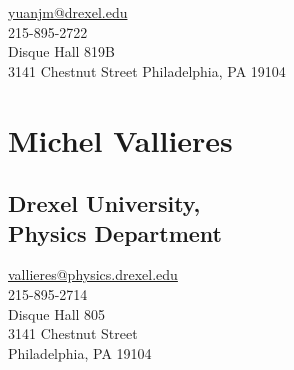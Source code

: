 \documentclass[]{scrartcl}
\begin{document}
\begin{cleanCV}
\url{yuanjm@drexel.edu}\\
215-895-2722\\
Disque Hall 819B\\
3141 Chestnut Street
Philadelphia, PA 19104

\section{Michel Vallieres}
\subsection{Drexel University,\\
Physics Department}

\url{vallieres@physics.drexel.edu}\\
215-895-2714\\
Disque Hall 805\\
3141 Chestnut Street\\
Philadelphia, PA 19104

\end{cleanCV}
\end{document}
